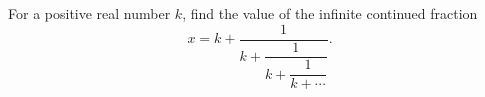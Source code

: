For a positive real number $k$, find the value of the infinite continued fraction
\[x=k+\dfrac{1}{k+\dfrac{1}{k+\dfrac{1}{k+\cdots}}}.\]
